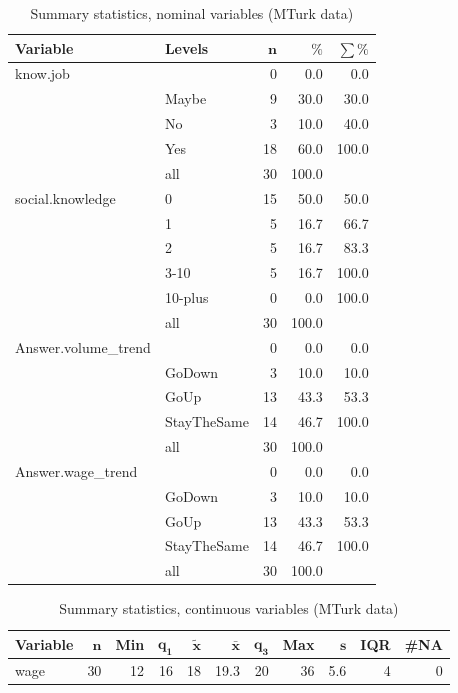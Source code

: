 \documentclass[a4paper,10pt]{article}\usepackage[]{graphicx}\usepackage[]{color}
\begin{document}
\begin{table}[ht]
\centering
{\footnotesize
\begin{tabular}{ll|rrr}
 \textbf{Variable} & \textbf{Levels} & $\mathbf{n}$ & $\mathbf{\%}$ & $\mathbf{\sum \%}$ \\ 
  \hline
know.job &  & 0 & 0.0 & 0.0 \\ 
   & Maybe & 9 & 30.0 & 30.0 \\ 
   & No & 3 & 10.0 & 40.0 \\ 
   & Yes & 18 & 60.0 & 100.0 \\ 
   \hline
 & all & 30 & 100.0 &  \\ 
   \hline
\hline
social.knowledge & 0 & 15 & 50.0 & 50.0 \\ 
   & 1 & 5 & 16.7 & 66.7 \\ 
   & 2 & 5 & 16.7 & 83.3 \\ 
   & 3-10 & 5 & 16.7 & 100.0 \\ 
   & 10-plus & 0 & 0.0 & 100.0 \\ 
   \hline
 & all & 30 & 100.0 &  \\ 
   \hline
\hline
Answer.volume\_trend &  & 0 & 0.0 & 0.0 \\ 
   & GoDown & 3 & 10.0 & 10.0 \\ 
   & GoUp & 13 & 43.3 & 53.3 \\ 
   & StayTheSame & 14 & 46.7 & 100.0 \\ 
   \hline
 & all & 30 & 100.0 &  \\ 
   \hline
\hline
Answer.wage\_trend &  & 0 & 0.0 & 0.0 \\ 
   & GoDown & 3 & 10.0 & 10.0 \\ 
   & GoUp & 13 & 43.3 & 53.3 \\ 
   & StayTheSame & 14 & 46.7 & 100.0 \\ 
   \hline
 & all & 30 & 100.0 &  \\ 
   \hline
\hline
\end{tabular}
}
\caption{Summary statistics, nominal variables (MTurk data)} 
\label{tab1:11-9190}
\end{table}
\begin{table}[ht]
\centering
{\footnotesize
\begin{tabular}{lrrrrrrrrrr}
 \textbf{Variable} & $\mathbf{n}$ & \textbf{Min} & $\mathbf{q_1}$ & $\mathbf{\widetilde{x}}$ & $\mathbf{\bar{x}}$ & $\mathbf{q_3}$ & \textbf{Max} & $\mathbf{s}$ & \textbf{IQR} & \textbf{\#NA} \\ 
  \hline
wage & 30 & 12 & 16 & 18 & 19.3 & 20 & 36 & 5.6 & 4 & 0 \\ 
  \end{tabular}
}
\caption{Summary statistics, continuous variables (MTurk data)} 
\label{tab2:11-9190}
\end{table}
\end{document}
